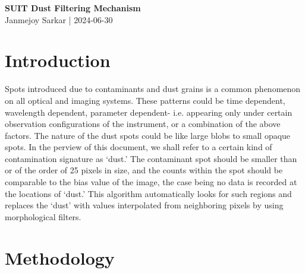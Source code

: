 \documentclass[11pt,a4paper]{article}
\begin{document}
\begin{center}
		\Large \textbf{{SUIT Dust Filtering Mechanism}}\\
	\normalsize Janmejoy Sarkar | 2024-06-30
\end{center}
	
	\section{Introduction}
	Spots introduced due to contaminants and dust grains is a common phenomenon on all optical and imaging systems. These patterns could be time dependent, wavelength dependent, parameter dependent- i.e. appearing only under certain observation configurations of the instrument, or a combination of the above factors. The nature of the dust spots could be like large blobs to small opaque spots. In the perview of  this document, we shall refer to a certain kind of contamination signature as `dust.' The contaminant spot should be smaller than or of the order of 25 pixels in size, and the counts within the spot should be comparable to the bias value of the image, the case being no data is recorded at the locations of `dust.' This algorithm automatically looks for such regions and replaces the `dust' with values interpolated from neighboring pixels by using morphological filters.
	
	\section{Methodology}
\end{document}
